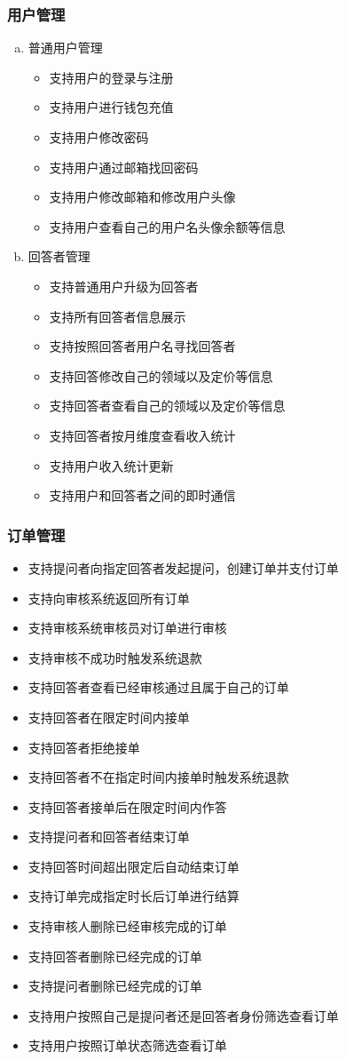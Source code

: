 \documentclass[12pt]{ctexart}
\begin{document}
\subsubsection{用户管理}
\begin{enumerate}[a)]
	\item 普通用户管理\begin{itemize}
		\item 支持用户的登录与注册
		\item 支持用户进行钱包充值
		\item 支持用户修改密码
		\item 支持用户通过邮箱找回密码
		\item 支持用户修改邮箱和修改用户头像
		\item 支持用户查看自己的用户名头像余额等信息
	\end{itemize}
	\item 回答者管理\begin{itemize}
		\item 支持普通用户升级为回答者
		\item 支持所有回答者信息展示
		\item 支持按照回答者用户名寻找回答者
		\item 支持回答修改自己的领域以及定价等信息
		\item 支持回答者查看自己的领域以及定价等信息
		\item 支持回答者按月维度查看收入统计
		\item 支持用户收入统计更新
		\item 支持用户和回答者之间的即时通信
	\end{itemize}
\end{enumerate}
\subsubsection{订单管理}
\begin{itemize}
	\item 支持提问者向指定回答者发起提问，创建订单并支付订单
	\item 支持向审核系统返回所有订单
	\item 支持审核系统审核员对订单进行审核
	\item 支持审核不成功时触发系统退款
	\item 支持回答者查看已经审核通过且属于自己的订单
	\item 支持回答者在限定时间内接单
	\item 支持回答者拒绝接单
	\item 支持回答者不在指定时间内接单时触发系统退款
	\item 支持回答者接单后在限定时间内作答
	\item 支持提问者和回答者结束订单
	\item 支持回答时间超出限定后自动结束订单
	\item 支持订单完成指定时长后订单进行结算
	\item 支持审核人删除已经审核完成的订单
	\item 支持回答者删除已经完成的订单
	\item 支持提问者删除已经完成的订单
	\item 支持用户按照自己是提问者还是回答者身份筛选查看订单
	\item 支持用户按照订单状态筛选查看订单
\end{itemize}
\end{document}
